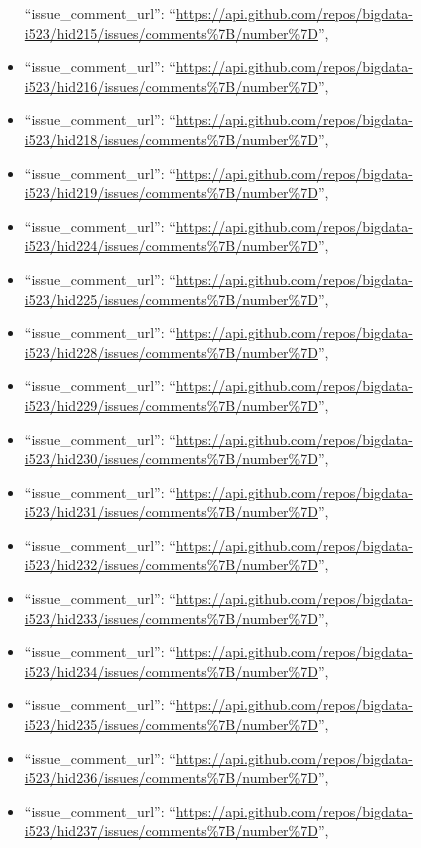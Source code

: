 \begin{itemize}
  ``issue\_comment\_url'':
  ``\url{https://api.github.com/repos/bigdata-i523/hid215/issues/comments\%7B/number\%7D}'',
\item
  ``issue\_comment\_url'':
  ``\url{https://api.github.com/repos/bigdata-i523/hid216/issues/comments\%7B/number\%7D}'',
\item
  ``issue\_comment\_url'':
  ``\url{https://api.github.com/repos/bigdata-i523/hid218/issues/comments\%7B/number\%7D}'',
\item
  ``issue\_comment\_url'':
  ``\url{https://api.github.com/repos/bigdata-i523/hid219/issues/comments\%7B/number\%7D}'',
\item
  ``issue\_comment\_url'':
  ``\url{https://api.github.com/repos/bigdata-i523/hid224/issues/comments\%7B/number\%7D}'',
\item
  ``issue\_comment\_url'':
  ``\url{https://api.github.com/repos/bigdata-i523/hid225/issues/comments\%7B/number\%7D}'',
\item
  ``issue\_comment\_url'':
  ``\url{https://api.github.com/repos/bigdata-i523/hid228/issues/comments\%7B/number\%7D}'',
\item
  ``issue\_comment\_url'':
  ``\url{https://api.github.com/repos/bigdata-i523/hid229/issues/comments\%7B/number\%7D}'',
\item
  ``issue\_comment\_url'':
  ``\url{https://api.github.com/repos/bigdata-i523/hid230/issues/comments\%7B/number\%7D}'',
\item
  ``issue\_comment\_url'':
  ``\url{https://api.github.com/repos/bigdata-i523/hid231/issues/comments\%7B/number\%7D}'',
\item
  ``issue\_comment\_url'':
  ``\url{https://api.github.com/repos/bigdata-i523/hid232/issues/comments\%7B/number\%7D}'',
\item
  ``issue\_comment\_url'':
  ``\url{https://api.github.com/repos/bigdata-i523/hid233/issues/comments\%7B/number\%7D}'',
\item
  ``issue\_comment\_url'':
  ``\url{https://api.github.com/repos/bigdata-i523/hid234/issues/comments\%7B/number\%7D}'',
\item
  ``issue\_comment\_url'':
  ``\url{https://api.github.com/repos/bigdata-i523/hid235/issues/comments\%7B/number\%7D}'',
\item
  ``issue\_comment\_url'':
  ``\url{https://api.github.com/repos/bigdata-i523/hid236/issues/comments\%7B/number\%7D}'',
\item
  ``issue\_comment\_url'':
  ``\url{https://api.github.com/repos/bigdata-i523/hid237/issues/comments\%7B/number\%7D}'',

\end{itemize}
